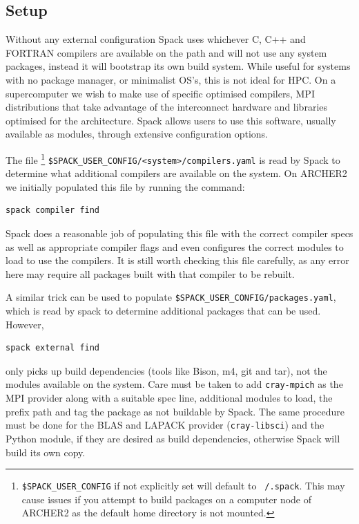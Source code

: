 \documentclass[a4paper,11pt]{article}
\begin{document}
\subsection{Setup}
\label{ssec:setup}
Without any external configuration Spack uses whichever C, C++ and FORTRAN compilers are available on the path and will not use any system packages, instead it will bootstrap its own build system.
While useful for systems with no package manager, or minimalist OS's, this is not ideal for HPC.
On a supercomputer we wish to make use of specific optimised compilers, MPI distributions that take advantage of the interconnect hardware and libraries optimised for the architecture.
Spack allows users to use this software, usually available as modules, through extensive configuration options.

The file
\footnote{\texttt{\$SPACK\_USER\_CONFIG} if not explicitly set will default to \texttt{~/.spack}. This may cause issues if you attempt to build packages on a computer node of ARCHER2 as the default home directory is not mounted.}
\verb`$SPACK_USER_CONFIG/<system>/compilers.yaml` is read by Spack to determine what additional compilers are available on the system.
On ARCHER2 we initially populated this file by running the command:
\begin{lstlisting}[numbers=none]
spack compiler find	
\end{lstlisting}
Spack does a reasonable job of populating this file with the correct compiler specs as well as appropriate compiler flags and even configures the correct modules to load to use the compilers.
It is still worth checking this file carefully, as any error here may require all packages built with that compiler to be rebuilt.

A similar trick can be used to populate \verb`$SPACK_USER_CONFIG/packages.yaml`, which is read by spack to determine additional packages that can be used.
However,
\begin{lstlisting}[numbers=none]
spack external find	
\end{lstlisting}
only picks up build dependencies (tools like Bison, m4, git and tar), not the modules available on the system.
Care must be taken to add \verb`cray-mpich` as the MPI provider along with a suitable spec line, additional modules to load, the prefix path and tag the package as not buildable by Spack.
The same procedure must be done for the BLAS and LAPACK provider (\verb`cray-libsci`) and the Python module, if they are desired as build dependencies, otherwise Spack will build its own copy.
\end{document}
